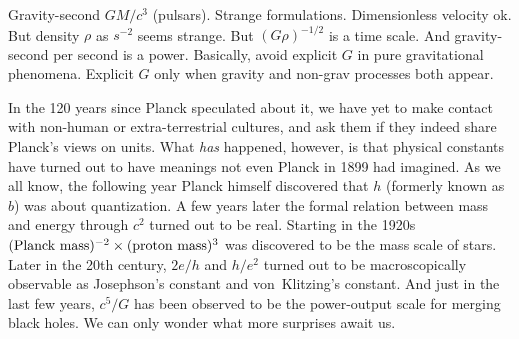 \documentclass[aps,prb,12pt]{revtex4-1}
\begin{document}
Gravity-second $GM/c^3$ (pulsars).  Strange formulations.
Dimensionless velocity ok.  But density $\rho$ as $s^{-2}$ seems
strange.  But $(G\rho)^{-1/2}$ is a time scale.  And gravity-second
per second is a power.  Basically, avoid explicit $G$ in pure
gravitational phenomena.  Explicit $G$ only when gravity and non-grav
processes both appear.

In the 120 years since Planck speculated about it, we have yet to make
contact with non-human or extra-terrestrial cultures, and ask them if
they indeed share Planck's views on units.  What {\em has} happened,
however, is that physical constants have turned out to have meanings
not even Planck in 1899 had imagined.  As we all know, the following
year Planck himself discovered that $h$ (formerly known as $b$) was
about quantization.  A few years later the formal relation between
mass and energy through $c^2$ turned out to be real.  Starting in the
1920s $(\hbox{Planck mass})^{-2}\times(\hbox{proton mass})^3$ was
discovered to be the mass scale of stars.  Later in the 20th century,
$2e/h$ and $h/e^2$ turned out to be macroscopically observable as
Josephson's constant and von~Klitzing's constant.  And just in the
last few years, $c^5/G$ has been observed to be the power-output scale
for merging black holes.  We can only wonder what more surprises await
us.

\def\aj{AJ}
\def\apjl{ApJL}
\def\aap{A\&A}
\def\mnras{MNRAS}
\def\pasj{PASJ}
\def\jgr{JGR}



\end{document}
